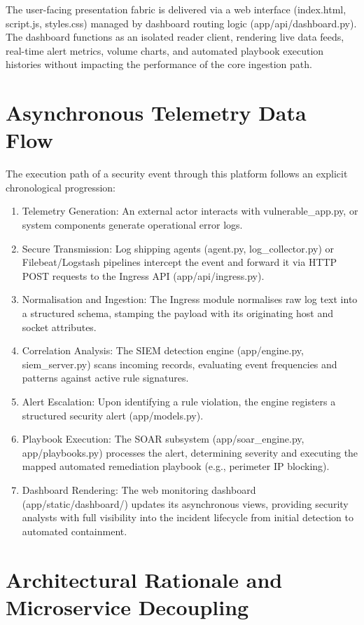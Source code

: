 The user-facing presentation fabric is delivered via a web interface (index.html, script.js, styles.css) managed by dashboard routing logic (app/api/dashboard.py). The dashboard functions as an isolated reader client, rendering live data feeds, real-time alert metrics, volume charts, and automated playbook execution histories without impacting the performance of the core ingestion path.

\section{Asynchronous Telemetry Data Flow}

The execution path of a security event through this platform follows an explicit chronological progression:

\begin{enumerate}
  \item Telemetry Generation: An external actor interacts with vulnerable\_app.py, or system components generate operational error logs.
  \item Secure Transmission: Log shipping agents (agent.py, log\_collector.py) or Filebeat/Logstash pipelines intercept the event and forward it via HTTP POST requests to the Ingress API (app/api/ingress.py).
  \item Normalisation and Ingestion: The Ingress module normalises raw log text into a structured schema, stamping the payload with its originating host and socket attributes.
  \item Correlation Analysis: The SIEM detection engine (app/engine.py, siem\_server.py) scans incoming records, evaluating event frequencies and patterns against active rule signatures.
  \item Alert Escalation: Upon identifying a rule violation, the engine registers a structured security alert (app/models.py).
  \item Playbook Execution: The SOAR subsystem (app/soar\_engine.py, app/playbooks.py) processes the alert, determining severity and executing the mapped automated remediation playbook (e.g., perimeter IP blocking).
  \item Dashboard Rendering: The web monitoring dashboard (app/static/dashboard/) updates its asynchronous views, providing security analysts with full visibility into the incident lifecycle from initial detection to automated containment.
\end{enumerate}

\section{Architectural Rationale and Microservice Decoupling}

